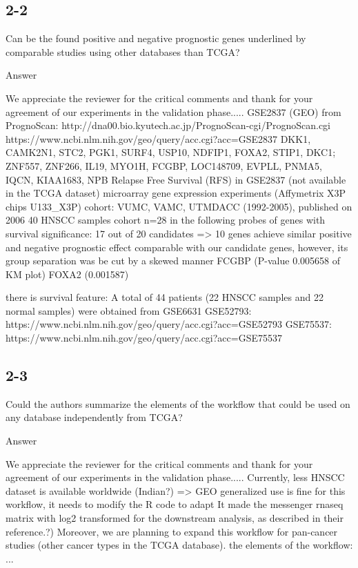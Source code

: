 \documentclass[preprint,12pt]{elsarticle}
\newenvironment{MyColorPar}[1]{%
    \leavevmode\color{#1}\ignorespaces%
}{%
}%
\begin{document}
\subsection*{2-2}
Can be the found positive and negative prognostic genes underlined by comparable studies using other databases than TCGA?

\begin{MyColorPar}{blue}
Answer

We appreciate the reviewer for the critical comments and thank for your agreement of our experiments in the validation phase.....
GSE2837 (GEO) from PrognoScan: http://dna00.bio.kyutech.ac.jp/PrognoScan-cgi/PrognoScan.cgi \cite{Mizuno2009a}
https://www.ncbi.nlm.nih.gov/geo/query/acc.cgi?acc=GSE2837 \cite{Chung2006}
DKK1, CAMK2N1, STC2, PGK1, SURF4, USP10, NDFIP1, FOXA2, STIP1, DKC1;
ZNF557, ZNF266, IL19, MYO1H, FCGBP, LOC148709, EVPLL, PNMA5, IQCN, KIAA1683, NPB
Relapse Free Survival (RFS) in GSE2837 (not available in the TCGA dataset)
microarray gene expression experiments (Affymetrix X3P chips U133\_X3P)
cohort: VUMC, VAMC, UTMDACC (1992-2005), published on 2006
40 HNSCC samples
cohort n=28 in the following probes of genes with survival significance:
17 out of 20 candidates => 10 genes achieve similar positive and negative prognostic effect comparable with our candidate genes, however, its group separation was be cut by a skewed manner
FCGBP (P-value 0.005658 of KM plot)
FOXA2 (0.001587)

there is survival feature:
A total of 44 patients (22 HNSCC samples and 22 normal samples) were obtained from GSE6631
GSE52793: https://www.ncbi.nlm.nih.gov/geo/query/acc.cgi?acc=GSE52793
GSE75537: https://www.ncbi.nlm.nih.gov/geo/query/acc.cgi?acc=GSE75537
\end{MyColorPar}

\subsection*{2-3}
Could the authors summarize the elements of the workflow that could be used on any database independently from TCGA?


\begin{MyColorPar}{blue}
Answer

We appreciate the reviewer for the critical comments and thank for your agreement of our experiments in the validation phase.....
Currently, less HNSCC dataset is available worldwide (Indian?) => GEO
generalized use is fine for this workflow, it needs to modify the R code to adapt 
It made the messenger \acrshort{rnaseq} matrix with log2 transformed for the downstream analysis, as described in their reference\cite{RSEM2016}.?)
Moreover, we are planning to expand this workflow for pan-cancer studies (other cancer types in the TCGA database).
the elements of the workflow: ...
\end{MyColorPar}
\end{document}
